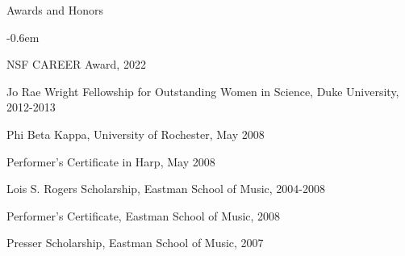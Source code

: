 \documentclass{resume} %
\begin{document}
\begin{rSection}{Awards and Honors}

\begin{list}{}{\leftmargin=0em}
   \itemsep -0.6em %
\item NSF CAREER Award, 2022
\item
Jo Rae Wright Fellowship for Outstanding Women in Science, Duke University, 2012-2013

\item
Phi Beta Kappa, University of Rochester, May 2008


\item
Performer's Certificate in Harp, May 2008



\item
Lois S. Rogers Scholarship, Eastman School of Music, 2004-2008

\item Performer's Certificate, Eastman School of Music, 2008

\item
Presser Scholarship, Eastman School of Music, 2007


\end{list}


\end{rSection}


\newpage
\end{document}
